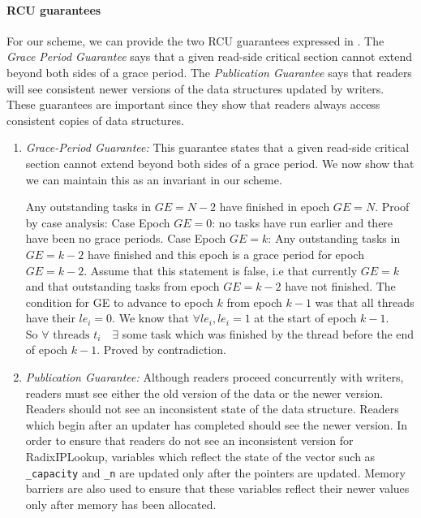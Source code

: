 \documentclass[a4paper,marginparwidth=50pt,marginparsep=10pt]{article}
\begin{document}
\paragraph{RCU guarantees} 
For our scheme, we can provide the two RCU guarantees expressed in \cite{urcu}. The \emph{Grace Period Guarantee} says that a given read-side critical section cannot extend beyond both sides of a grace period. The \emph{Publication Guarantee} says that readers will see consistent newer versions of the data structures updated by writers. These guarantees are important since they show that readers always access consistent copies of data structures. 
\begin{enumerate}
\item \emph{Grace-Period Guarantee:} This guarantee states that a given read-side critical section cannot extend beyond both sides of a grace period. We now show that we can maintain this as an invariant in our scheme.

\begin{algorithmic}
\STATE Any outstanding tasks in $GE=N-2$ have finished in epoch $GE=N$.
\STATE Proof by case analysis:
\STATE Case Epoch $GE=0$: no tasks have run earlier and there have been no grace periods.
\STATE Case Epoch $GE=k$: Any outstanding tasks in $GE=k-2$ have finished and this epoch is a grace period for epoch $GE=k-2$. 
\STATE Assume that this statement is false, i.e that currently $GE=k$ and that outstanding tasks from epoch $GE=k-2$ have not finished. The condition for GE to advance to epoch $k$ from epoch $k-1$ was that all threads have their  $le_i=0$. We know that $\forall le_i, le_i=1$ at the start of epoch $k-1$. \\So $\forall \mbox{ threads }t_i\mbox{ }$ $\exists$ some task which was finished by the thread before the end of epoch $k-1$. Proved by contradiction.  
\end{algorithmic}

\item \emph{Publication Guarantee:} 
Although readers proceed concurrently with writers, readers must see either the old version of the data or the newer version. Readers should not see an inconsistent state of the data structure. Readers which begin after an updater has completed should see the newer version. In order to ensure that readers do not see an inconsistent version for RadixIPLookup, variables which reflect the state of the vector such as \verb+_capacity+ and \verb+_n+ are updated only after the pointers are updated. Memory barriers are also used to ensure that these variables reflect their newer values only after memory has been allocated.\\
\end{enumerate}
\end{document}

